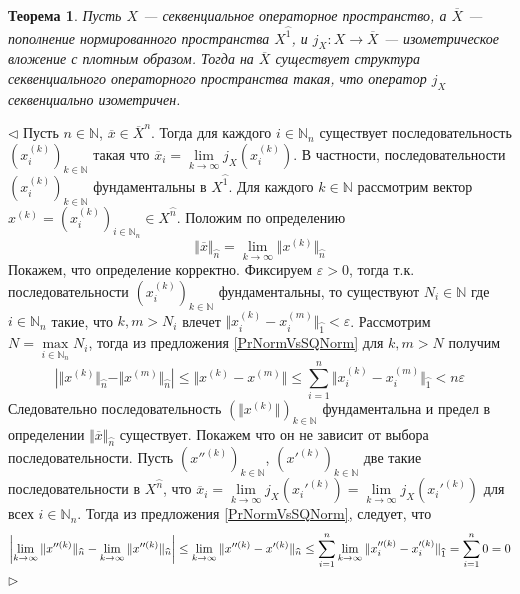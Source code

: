 \documentclass[12pt]{article}
\newtheorem{theorem}{Теорема}[subsection]
\newenvironment{proof}{\par $\triangleleft$}{$\triangleright$}
\begin{document}
\begin{theorem}\label{ThSQCompl}
Пусть $X$ --- секвенциальное операторное пространство, а $\overline{X}$ --- пополнение нормированного пространства $X^{\wideparen{1}}$, и $j_X:X\to \overline{X}$ --- изометрическое вложение с плотным образом. Тогда на $\overline{X}$ 
существует структура секвенциального операторного пространства такая, что оператор $j_X$ секвенциально изометричен. 
\end{theorem}
\begin{proof} Пусть $n\in\mathbb{N}$, $\overline{x}\in \overline{X}^{n}$. Тогда для каждого $i\in\mathbb{N}_n$ существует последовательность $(x_i^{(k)})_{k\in\mathbb{N}}$ такая что $\overline{x}_i=\lim\limits_{k\to\infty}j_X(x_i^{(k)})$. 
В частности, последовательности $(x_i^{(k)})_{k\in\mathbb{N}}$ фундаментальны в $X^{\wideparen{1}}$. Для каждого $k\in\mathbb{N}$ рассмотрим вектор $x^{(k)}=(x_i^{(k)})_{i\in\mathbb{N}_n}\in X^{\wideparen{n}}$. Положим по определению
$$
\Vert\overline{x}\Vert_{\wideparen{n}}=\lim\limits_{k\to\infty}\Vert x^{(k)}\Vert_{\wideparen{n}}
$$
Покажем, что определение корректно. Фиксируем $\varepsilon>0$, тогда т.к. последовательности $(x_i^{(k)})_{k\in\mathbb{N}}$ фундаментальны, то существуют $N_i\in\mathbb{N}$ где $i\in\mathbb{N}_n$ такие, что $k,m>N_i$ влечет 
$\Vert x_i^{(k)}-x_i^{(m)}\Vert_{\wideparen{1}}<\varepsilon$. Рассмотрим $N=\max\limits_{i\in\mathbb{N}_n}N_i$, тогда из предложения \ref{PrNormVsSQNorm} для $k,m>N$ получим
$$
\left|\Vert x^{(k)}\Vert_{\wideparen{n}}-\Vert x^{(m)}\Vert_{\wideparen{n}}\right|\leq\Vert x^{(k)}-x^{(m)}\Vert\leq\sum\limits_{i=1}^n\Vert x_i^{(k)}-x_i^{(m)}\Vert_{\wideparen{1}}<n\varepsilon
$$
Следовательно последовательность $(\Vert x^{(k)}\Vert)_{k\in\mathbb{N}}$ фундаментальна и предел в определении $\Vert \overline{x}\Vert_{\wideparen{n}}$ существует. Покажем что он не зависит от выбора последовательности. 
Пусть $(x''^{(k)})_{k\in\mathbb{N}}$, $(x'^{(k)})_{k\in\mathbb{N}}$ две такие последовательности в $X^{\wideparen{n}}$, что $\overline{x}_i=\lim\limits_{k\to\infty} j_X(x_i'^{(k)})=\lim\limits_{k\to\infty} j_X(x_i'^{(k)})$ для 
всех $i\in\mathbb{N}_n$. Тогда из предложения \ref{PrNormVsSQNorm}, следует, что 
$$
\left|\lim\limits_{k\to\infty}\Vert x''^{(k)}\Vert_{\wideparen{n}}-\lim\limits_{k\to\infty}\Vert x''^{(k)}\Vert_{\wideparen{n}}\right|\leq
\lim\limits_{k\to\infty}\Vert x''^{(k)}-x'^{(k)}\Vert_{\wideparen{n}}\leq
\sum\limits_{i=1}^n\lim\limits_{k\to\infty}\Vert x_i''^{(k)}-x_i'^{(k)}\Vert_{\wideparen{1}}\\
=\sum\limits_{i=1}^n0=0
$$
\end{proof}
\end{document}
